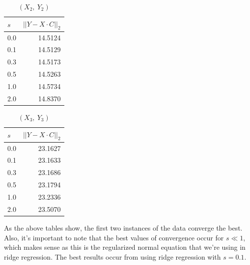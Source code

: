 \documentclass[11pt]{article}
\begin{document}
\begin{table}[H]
\centering
\caption{$(X_{2},\ Y_{2})$}
\begin{tabular}{@{}l r@{}}
\hline\hline
$s$ & $\left|\left| Y - X\cdot C\right|\right|_{2}$\\
\hline
0.0 & 14.5124 \\
0.1 & 14.5129 \\
0.3 & 14.5173 \\
0.5 & 14.5263 \\
1.0 & 14.5734 \\
2.0 & 14.8370 \\
\hline
\end{tabular}
\end{table}

\begin{table}[H]
\centering
\caption{$(X_{3},\ Y_{3})$}
\begin{tabular}{@{}l r@{}}
\hline\hline
$s$ & $\left|\left| Y - X\cdot C\right|\right|_{2}$\\
\hline
0.0 & 23.1627 \\
0.1 & 23.1633 \\
0.3 & 23.1686 \\
0.5 & 23.1794 \\
1.0 & 23.2336 \\
2.0 & 23.5070 \\
\hline
\end{tabular}
\end{table}

As the above tables show, the first two instances of the data converge the best. Also, it's important to note that the best values of convergence occur for $s \ll 1$, which makes sense as this is the regularized normal equation that we're using in ridge regression. The best results occur from using ridge regression with $s = 0.1$.

\end{document}
